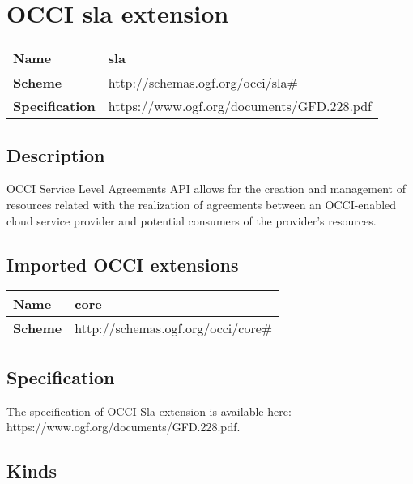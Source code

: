 \section{OCCI sla extension}
\begin{center}
\begin{tabular}{|l|l|}
  \hline
  \textbf{Name} & sla \\
  \hline  
  \textbf{Scheme} & http://schemas.ogf.org/occi/sla\# \\
  \hline
  \textbf{Specification} & https://www.ogf.org/documents/GFD.228.pdf \\
  \hline
\end{tabular}
\end{center}

\subsection{Description}
OCCI Service Level Agreements API allows for the creation and management of resources related with the realization of agreements between an OCCI-enabled cloud service provider and potential consumers of the provider's resources.
\subsection{Imported OCCI extensions}

\begin{center} 
\begin{tabular}{|l|l|}
  \hline
  \textbf{Name} & core \\
  \hline  
  \textbf{Scheme} & http://schemas.ogf.org/occi/core\# \\
  \hline
\end{tabular}
\end{center}


\subsection{Specification}
The specification of OCCI Sla extension is available here: https://www.ogf.org/documents/GFD.228.pdf.
\subsection{Kinds}
